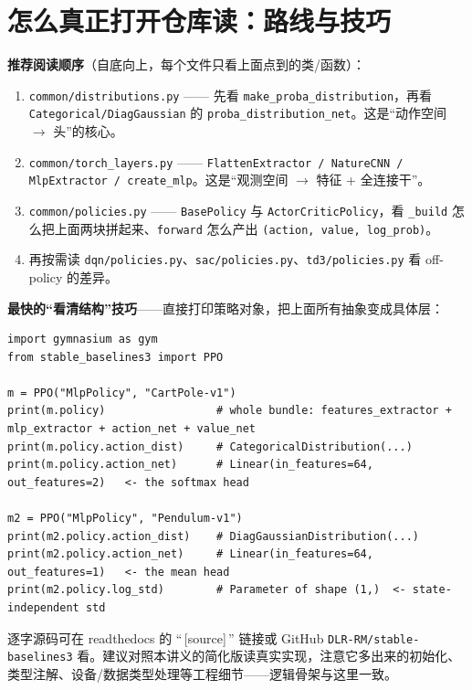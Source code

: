 \documentclass[11pt,a4paper]{article}
\begin{document}
\section{怎么真正打开仓库读：路线与技巧}
\label{sec:read}

\textbf{推荐阅读顺序}（自底向上，每个文件只看上面点到的类/函数）：
\begin{enumerate}
\item \texttt{common/distributions.py} —— 先看 \texttt{make\_proba\_distribution}，再看 \texttt{Categorical/DiagGaussian} 的 \texttt{proba\_distribution\_net}。这是“动作空间 $\to$ 头”的核心。
\item \texttt{common/torch\_layers.py} —— \texttt{FlattenExtractor / NatureCNN / MlpExtractor / create\_mlp}。这是“观测空间 $\to$ 特征 + 全连接干”。
\item \texttt{common/policies.py} —— \texttt{BasePolicy} 与 \texttt{ActorCriticPolicy}，看 \texttt{\_build} 怎么把上面两块拼起来、\texttt{forward} 怎么产出 \texttt{(action, value, log\_prob)}。
\item 再按需读 \texttt{dqn/policies.py}、\texttt{sac/policies.py}、\texttt{td3/policies.py} 看 off-policy 的差异。
\end{enumerate}

\textbf{最快的“看清结构”技巧}——直接打印策略对象，把上面所有抽象变成具体层：

\begin{lstlisting}
import gymnasium as gym
from stable_baselines3 import PPO

m = PPO("MlpPolicy", "CartPole-v1")
print(m.policy)                 # whole bundle: features_extractor + mlp_extractor + action_net + value_net
print(m.policy.action_dist)     # CategoricalDistribution(...)
print(m.policy.action_net)      # Linear(in_features=64, out_features=2)   <- the softmax head

m2 = PPO("MlpPolicy", "Pendulum-v1")
print(m2.policy.action_dist)    # DiagGaussianDistribution(...)
print(m2.policy.action_net)     # Linear(in_features=64, out_features=1)   <- the mean head
print(m2.policy.log_std)        # Parameter of shape (1,)  <- state-independent std
\end{lstlisting}

\begin{srcbox}[在线源码]
逐字源码可在 readthedocs 的 “\,[source]\,” 链接或 GitHub \texttt{DLR-RM/stable-baselines3} 看。建议对照本讲义的简化版读真实实现，注意它多出来的初始化、类型注解、设备/数据类型处理等工程细节——逻辑骨架与这里一致。
\end{srcbox}
\end{document}
